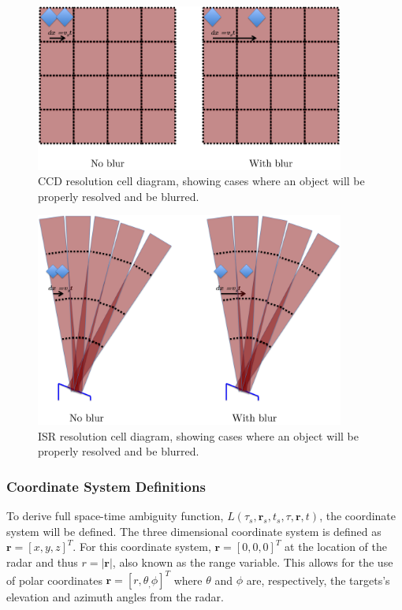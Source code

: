 \begin{figure}[h!]
\centering
	\includegraphics[width=4in]{ccddiagramall}
	\caption{CCD resolution cell diagram, showing cases where an object will be properly resolved and be blurred.}
	\label{fig:ccd}
\end{figure}

\begin{figure}[h!]
\centering
	\includegraphics[width=4in]{radardiagramall}
	\caption{ISR resolution cell diagram, showing cases where an object will be properly resolved and be blurred.}
	\label{fig:radarblur}
\end{figure}

\subsubsection{Coordinate System Definitions}

To derive full space-time ambiguity function, $L(\tau_s,\mathbf{r}_s,t_s,\tau,\mathbf{r},t)$, the coordinate system will be defined.  The three dimensional coordinate system is defined as $\mathbf{r}=[x,y,z]^T$. For this coordinate system, $\mathbf{r}=[0,0,0]^T$ at the location of the radar and thus $r=|\mathbf{r}|$, also known as the range variable. This allows for the use of polar coordinates $\mathbf{r} =  [r,\theta_,\phi]^T$ where $\theta$ and $\phi$ are, respectively, the targets's elevation and azimuth angles from the radar.

